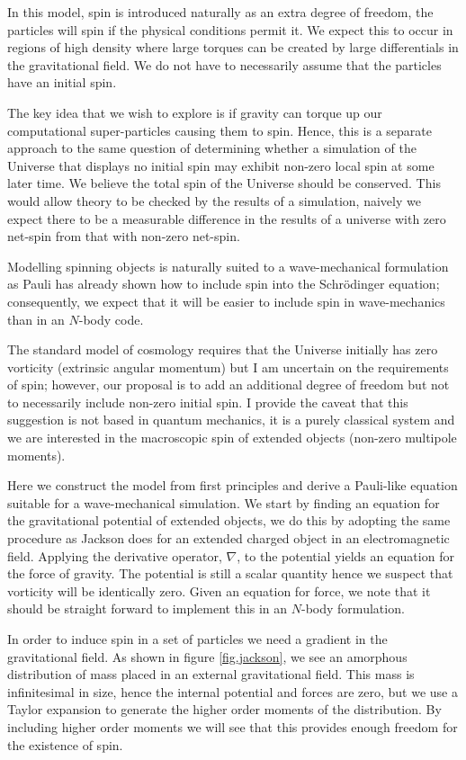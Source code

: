 In this model, spin is introduced naturally as an extra degree of freedom, the particles will spin if the physical conditions permit it. We expect this to occur in regions of high density where large torques can be created by large differentials in the gravitational field. We do not have to necessarily assume that the particles have an initial spin.

The key idea that we wish to explore is if gravity can torque up our computational super-particles causing them to spin. Hence, this is a separate approach to the same question of determining whether a simulation of the Universe that displays no initial spin may exhibit non-zero local spin at some later time. We believe the total spin of the Universe should be conserved. This would allow theory to be checked by the results of a simulation, naively we expect there to be a measurable difference in the results of a universe with zero net-spin from that with non-zero net-spin.

Modelling spinning objects is naturally suited to a wave-mechanical formulation as Pauli has already shown how to include spin into the Schr\"odinger equation; consequently, we expect that it will be easier to include spin in wave-mechanics than in an $N$-body code.

The standard model of cosmology requires that the Universe initially has zero vorticity (extrinsic angular momentum) but I am uncertain on the requirements of spin; however, our proposal is to add an additional degree of freedom but not to necessarily include non-zero initial spin. I provide the caveat that this suggestion is not based in quantum mechanics, it is a purely classical system and we are interested in the macroscopic spin of extended objects (non-zero multipole moments).

Here we construct the model from first principles and derive a Pauli-like equation suitable for a wave-mechanical simulation. We start by finding an equation for the gravitational potential of extended objects, we do this by adopting the same procedure as Jackson \citep{bib_jack} does for an extended charged object in an electromagnetic field. Applying the derivative operator, $\nabla$, to the potential yields an equation for the force of gravity. The potential is still a scalar quantity hence we suspect that vorticity will be identically zero. Given an equation for force, we note that it should be straight forward to implement this in an $N$-body formulation.

In order to induce spin in a set of particles we need a gradient in the gravitational field. As shown in figure \ref{fig.jackson}, we see an amorphous distribution of mass placed in an external gravitational field. This mass is infinitesimal in size, hence the internal potential and forces are zero, but we use a Taylor expansion to generate the higher order moments of the distribution. By including higher order moments we will see that this provides enough freedom for the existence of spin.

